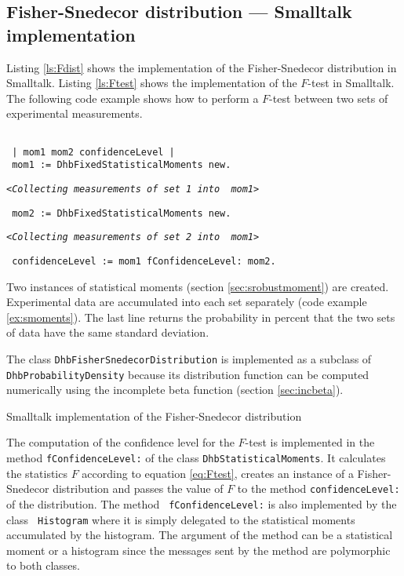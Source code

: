 \documentclass[twoside]{book}
\begin{document}
\subsection{Fisher-Snedecor distribution --- Smalltalk implementation}
 Listing \ref{ls:Fdist} shows
the implementation of the Fisher-Snedecor distribution in
Smalltalk. Listing \ref{ls:Ftest} shows the implementation of the
$F$-test in Smalltalk. The following code example shows how to
perform a $F$-test between two sets of experimental measurements.
\begin{codeExample}
\label{exs:Ftest}
\begin{verbatim}

 | mom1 mom2 confidenceLevel |
 mom1 := DhbFixedStatisticalMoments new.
\end{verbatim}
\hfil{\tt<\sl Collecting measurements of set 1 into \tt
mom1>}\hfil
\begin{verbatim}
 mom2 := DhbFixedStatisticalMoments new.
\end{verbatim}
\hfil{\tt<\sl Collecting measurements of set 2 into \tt
mom1>}\hfil
\begin{verbatim}
 confidenceLevel := mom1 fConfidenceLevel: mom2.
\end{verbatim}
\end{codeExample}
Two instances of statistical moments (\cf section
\ref{sec:srobustmoment}) are created. Experimental data are
accumulated into each set separately (\cf code example
\ref{ex:smoments}). The last line returns the probability in
percent that the two sets of data have the same standard
deviation.

The class {\tt DhbFisherSnedecorDistribution} is implemented as a
subclass of {\tt DhbProbabilityDensity} because its distribution
function can be computed numerically using the incomplete beta
function (\cf section \ref{sec:incbeta}).

\begin{listing} Smalltalk implementation of the Fisher-Snedecor distribution \label{ls:Fdist}

\end{listing}

The computation of the confidence level for the $F$-test is
implemented in the method {\tt fConfidenceLevel:} of the class
{\tt DhbStatisticalMoments}. It calculates the statistics $F$
according to equation \ref{eq:Ftest}, creates an instance of a
Fisher-Snedecor distribution and passes the value of $F$ to the
method {\tt confidenceLevel:} of the distribution. The method {\tt
fConfidenceLevel:} is also implemented by the class {\tt
Histogram} where it is simply delegated to the statistical moments
accumulated by the histogram. The argument of the method can be a
statistical moment or a histogram since the messages sent by the
method are polymorphic to both classes.
\end{document}
